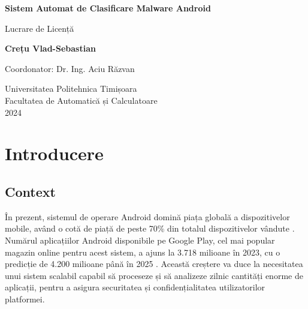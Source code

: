 \documentclass[12pt,a4paper]{report}
\begin{document}
\begin{titlepage}
    \centering
    \vspace*{1cm}
    
    \Huge
    \textbf{Sistem Automat de Clasificare Malware Android}
    
    \vspace{0.5cm}
    \LARGE
    Lucrare de Licență
    
    \vspace{1.5cm}
    
    \textbf{Crețu Vlad-Sebastian}
    
    \vfill
    
    \Large
    Coordonator: Dr. Ing. Aciu Răzvan
    
    \vspace{0.8cm}
    
    
    Universitatea Politehnica Timișoara\\
    Facultatea de Automatică și Calculatoare\\
    2024
    
\end{titlepage}

\tableofcontents


\chapter{Introducere}
\section{Context}
În prezent, sistemul de operare Android domină piața globală a dispozitivelor mobile, 
având o cotă de piață de peste 70\% din totalul dispozitivelor vândute \cite{stat-counter}. 
Numărul aplicațiilor Android disponibile pe Google Play, cel mai popular magazin online 
pentru acest sistem, a ajuns la 3.718 milioane în 2023, cu o predicție de 4.200 milioane
până în 2025 \cite{number-of-google-play-store-apps}. Această creștere va duce la 
necesitatea unui sistem scalabil capabil să proceseze și să analizeze zilnic cantități 
enorme de aplicații, pentru a asigura securitatea și confidențialitatea utilizatorilor platformei.
\end{document}
